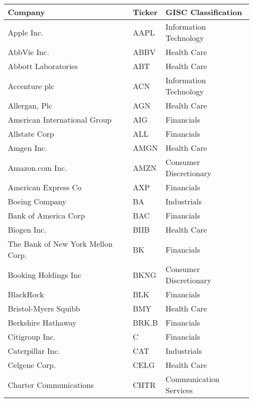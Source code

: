 \begin{table}[p]
\centering
\begin{tabular}{@{}lll@{}}
\toprule\toprule
Company & Ticker & GISC Classification \\ \midrule
Apple Inc.                        & AAPL  & Information Technology \\ 
AbbVie Inc.                       & ABBV  & Health Care            \\
Abbott Laboratories               & ABT   & Health Care            \\
Accenture plc                     & ACN   & Information Technology \\
Allergan, Plc                     & AGN   & Health Care            \\
American International Group      & AIG   & Financials             \\
Allstate Corp                     & ALL   & Financials             \\
Amgen Inc.                        & AMGN  & Health Care            \\
Amazon.com Inc.                   & AMZN  & Consumer Discretionary \\
American Express Co               & AXP   & Financials             \\
Boeing Company                    & BA    & Industrials            \\
Bank of America Corp              & BAC   & Financials             \\
Biogen Inc.                       & BIIB  & Health Care            \\
The Bank of New York Mellon Corp. & BK    & Financials             \\
Booking Holdings Inc              & BKNG  & Consumer Discretionary \\
BlackRock                         & BLK   & Financials             \\
Bristol-Myers Squibb              & BMY   & Health Care            \\
Berkshire Hathaway                & BRK.B & Financials             \\
Citigroup Inc.                    & C     & Financials             \\
Caterpillar Inc.                  & CAT   & Industrials            \\
Celgene Corp.                     & CELG  & Health Care            \\
Charter Communications            & CHTR  & Communication Services \\

\end{tabular}
\end{table}
